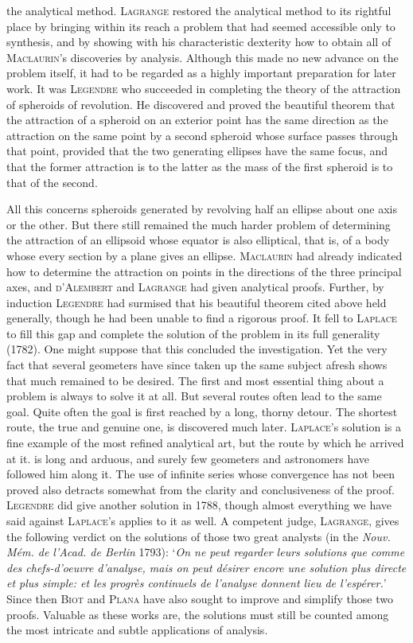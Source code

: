 the analytical method. \textsc{Lagrange} restored the analytical method to its rightful place by bringing within its reach a problem that had seemed accessible only to synthesis, and by showing with his characteristic dexterity how to obtain all of \textsc{Maclaurin}'s discoveries by analysis. Although this made no new advance on the problem itself, it had to be regarded as a highly important preparation for later work. It was \textsc{Legendre} who succeeded in completing the theory of the attraction of spheroids of revolution. He discovered and proved the beautiful theorem that the attraction of a spheroid on an exterior point has the same direction as the attraction on the same point by a second spheroid whose surface passes through that point, provided that the two generating ellipses have the same focus, and that the former attraction is to the latter as the mass of the first spheroid is to that of the second.

All this concerns spheroids generated by revolving half an ellipse about one axis or the other. But there still remained the much harder problem of determining the attraction of an ellipsoid whose equator is also elliptical, that is, of a body whose every section by a plane gives an ellipse. \textsc{Maclaurin} had already indicated how to determine the attraction on points in the directions of the three principal axes, and \textsc{d'Alembert} and \textsc{Lagrange} had given analytical proofs. Further, by induction \textsc{Legendre} had surmised that his beautiful theorem cited above held generally, though he had been unable to find a rigorous proof. It fell to \textsc{Laplace} to fill this gap and complete the solution of the problem in its full generality (1782). One might suppose that this concluded the investigation. Yet the very fact that several geometers have since taken up the same subject afresh shows that much remained to be desired. The first and most essential thing about a problem is always to solve it at all. But several routes often lead to the same goal. Quite often the goal is first reached by a long, thorny detour. The shortest route, the true and genuine one, is discovered much later. \textsc{Laplace}'s solution is a fine example of the most refined analytical art, but the route by which he arrived at it. is long and arduous, and surely few geometers and
astronomers have followed him along it. The use of infinite series whose convergence has not been proved also detracts somewhat from the clarity and conclusiveness of the proof. \textsc{Legendre} did give another solution in 1788, though almost everything we have said against \textsc{Laplace}'s applies to it as well. A competent judge, \textsc{Lagrange}, gives the following verdict on the solutions of those two great analysts (in the \textit{Nouv. Mém. de l'Acad. de Berlin} 1793): ‘\textit{On ne peut regarder leurs solutions que comme des chefs-d'oeuvre d'analyse, mais on peut désirer encore une solution plus directe et plus simple: et les progrès continuels de l'analyse donnent lieu de l'espérer.}’ Since then \textsc{Biot} and \textsc{Plana} have also sought to improve and simplify those two proofs. Valuable as these works are, the solutions must still be counted among the most intricate and subtle applications of analysis.


